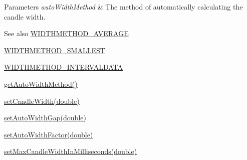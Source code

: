 \begin{DoxyParams}{Parameters}
{\em auto\+Width\+Method} & The method of automatically calculating the candle width.\\
\hline
\end{DoxyParams}
\begin{DoxySeeAlso}{See also}
\mbox{\hyperlink{classorg_1_1jfree_1_1chart_1_1renderer_1_1xy_1_1_candlestick_renderer_a3e96421ed7be8208f8e2e48ade0a21d2}{W\+I\+D\+T\+H\+M\+E\+T\+H\+O\+D\+\_\+\+A\+V\+E\+R\+A\+GE}} 

\mbox{\hyperlink{classorg_1_1jfree_1_1chart_1_1renderer_1_1xy_1_1_candlestick_renderer_a08d0154361d463e8d2204bbb8d79eb27}{W\+I\+D\+T\+H\+M\+E\+T\+H\+O\+D\+\_\+\+S\+M\+A\+L\+L\+E\+ST}} 

\mbox{\hyperlink{classorg_1_1jfree_1_1chart_1_1renderer_1_1xy_1_1_candlestick_renderer_ad08aaacfba7eb3a8baff3e09769c8385}{W\+I\+D\+T\+H\+M\+E\+T\+H\+O\+D\+\_\+\+I\+N\+T\+E\+R\+V\+A\+L\+D\+A\+TA}} 

\mbox{\hyperlink{classorg_1_1jfree_1_1chart_1_1renderer_1_1xy_1_1_candlestick_renderer_aeb7c08c7e6bbdbfe7b1ef2ddbcf0ac34}{get\+Auto\+Width\+Method()}} 

\mbox{\hyperlink{classorg_1_1jfree_1_1chart_1_1renderer_1_1xy_1_1_candlestick_renderer_a212b98d88bbc173df25fcafd7f983ff3}{set\+Candle\+Width(double)}} 

\mbox{\hyperlink{classorg_1_1jfree_1_1chart_1_1renderer_1_1xy_1_1_candlestick_renderer_ae86e0bc0453129bf8579ae7a5d2ee821}{set\+Auto\+Width\+Gap(double)}} 

\mbox{\hyperlink{classorg_1_1jfree_1_1chart_1_1renderer_1_1xy_1_1_candlestick_renderer_a0189cacb382b9e002ad932e555a79664}{set\+Auto\+Width\+Factor(double)}} 

\mbox{\hyperlink{classorg_1_1jfree_1_1chart_1_1renderer_1_1xy_1_1_candlestick_renderer_a7f28bced2a25bf012d05127ac175af49}{set\+Max\+Candle\+Width\+In\+Milliseconds(double)}} 
\end{DoxySeeAlso}
\mbox{\label{classorg_1_1jfree_1_1chart_1_1renderer_1_1xy_1_1_candlestick_renderer_a212b98d88bbc173df25fcafd7f983ff3}} 
